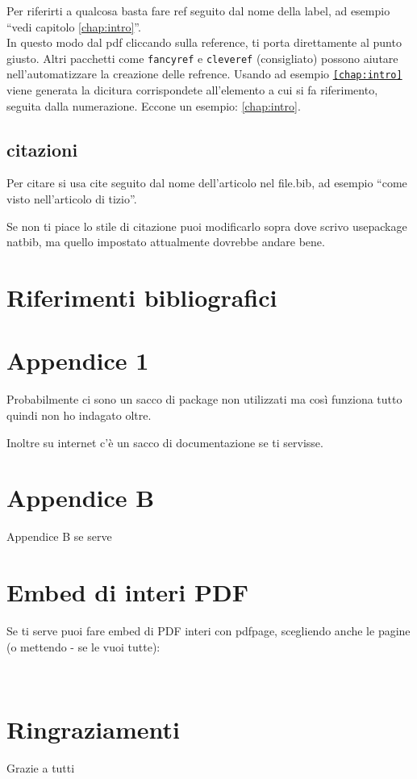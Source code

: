 \documentclass[12pt,a4paper,twoside]{book}
\begin{document}
Per riferirti a qualcosa basta fare ref seguito dal nome della label, ad esempio ``vedi capitolo \ref{chap:intro}''.\\In questo modo dal pdf cliccando sulla reference, ti porta direttamente al punto giusto.
Altri pacchetti come \texttt{fancyref} e \texttt{cleveref} (consigliato) possono aiutare nell'automatizzare la creazione delle refrence. Usando ad esempio \texttt{\cref{chap:intro}} viene generata la dicitura corrispondete all'elemento a cui si fa riferimento, seguita dalla numerazione. Eccone un esempio: \cref{chap:intro}.
\section{citazioni}
Per citare si usa cite seguito dal nome dell'articolo nel file.bib, ad esempio ``come visto nell'articolo di tizio\cite{greenwade93}''.

Se non ti piace lo stile di citazione puoi modificarlo sopra dove scrivo usepackage natbib, ma quello impostato attualmente dovrebbe andare bene.



\renewcommand{\bibsection}{}
\chapter*{Riferimenti bibliografici}

\newpage

\renewcommand{\appendixtocname}{Appendici}
\renewcommand{\appendixpagename}{Appendici}
{}
\begin{appendices}
\chapter{Appendice 1}
\label{Appendice:A}
Probabilmente ci sono un sacco di package non utilizzati ma così funziona tutto quindi non ho indagato oltre.

Inoltre su internet c'è un sacco di documentazione se ti servisse.
\chapter{Appendice B}
\label{Appendice:B}
Appendice B se serve

\chapter{Embed di interi PDF}
\label{Appendice:C}
Se ti serve puoi fare embed di PDF interi con pdfpage, scegliendo anche le pagine (o mettendo - se le vuoi tutte):


\end{appendices}

\newpage~\newpage
\chapter*{Ringraziamenti}
Grazie a tutti
\end{document}

